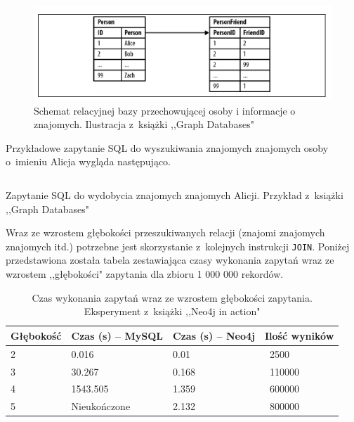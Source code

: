 \documentclass[brudnopis]{xmgr}
\begin{document}
\begin{figure}[H]
        \centering
	\includegraphics[scale=0.75]{images/relational-schema-friends.png}
	\caption{Schemat relacyjnej bazy przechowującej osoby i informacje o znajomych. Ilustracja z~książki ,,Graph Databases"\cite{Robinson:2013:GD}}
\end{figure}

Przykładowe zapytanie SQL do wyszukiwania znajomych znajomych osoby o~imieniu Alicja wygląda następująco.

\begin{listing}[H]
	\inputminted{sql}{listings/sql/relational-schema-friends-fof-query.sql}
	\caption{Zapytanie SQL do wydobycia znajomych znajomych Alicji. Przykład z~książki ,,Graph Databases"\cite{Robinson:2013:GD}}
\end{listing}

\newpage
Wraz ze wzrostem głębokości przeszukiwanych relacji (znajomi znajomych znajomych itd.) potrzebne jest skorzystanie z~kolejnych instrukcji \texttt{JOIN}. Poniżej przedstawiona została tabela zestawiająca czasy wykonania zapytań wraz ze wzrostem ,,głębokości" zapytania dla zbioru 1 000 000 rekordów.

\begin{table}[H]
    \centering
    \begin{tabular}{|l|l|l|l|}
      \hline 
      \textbf{Głębokość} & \textbf{Czas (s) -- MySQL} & \textbf{Czas (s) -- Neo4j} & \textbf{Ilość wyników} \\
      \hline
      2 & 0.016 & 0.01 & {~}2500 \\
      3 & 30.267 & 0.168 & {~}110000 \\
      4 & 1543.505 & 1.359 & {~}600000 \\
      5 & Nieukończone & 2.132 & {~}800000 \\
      \hline
   \end{tabular} 
    \caption{Czas wykonania zapytań wraz ze wzrostem głębokości zapytania. Eksperyment z~książki ,,Neo4j in action"\cite{neo4jinaction}}
    \label{fig:mysqlvsneo4j_results}
\end{table}
\end{document}
